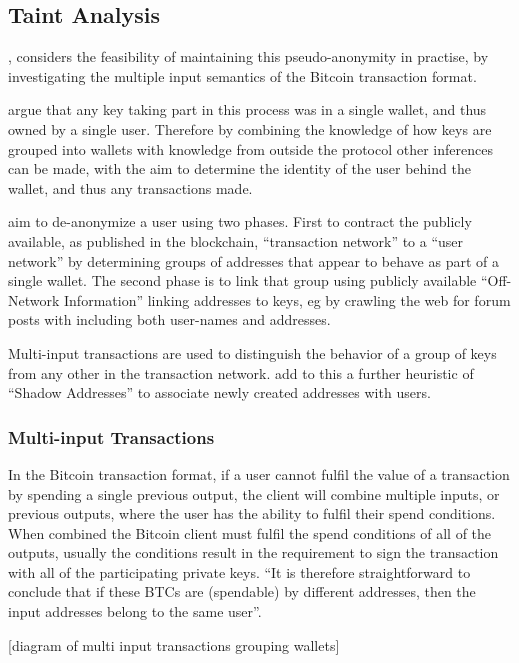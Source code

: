 \subsection{Taint Analysis} \textcite{reid-anon}, considers the feasibility of maintaining this pseudo-anonymity in practise, by investigating the multiple input semantics of the Bitcoin transaction format. 


\textcite{reid-anon} argue that any key taking part in this process was in a single wallet, and thus owned by a single user. Therefore by combining the knowledge of how keys are grouped into wallets with knowledge from outside the protocol other inferences can be made, with the aim to determine the identity of the user behind the wallet, and thus any transactions made.


\textcite{reid-anon} aim to de-anonymize a user using two phases.  First to contract the publicly available, as published in the blockchain, ``transaction network'' to a ``user network'' by determining groups of addresses that appear to behave as part of a single wallet.  The second phase is to  link that group using publicly available ``Off-Network Information'' linking addresses to keys, eg by crawling the web for forum posts with including both user-names and addresses.


Multi-input transactions are used to distinguish the behavior of a group of keys from any other in the transaction network.  \textcite{eval-priv} add to this a further heuristic of ``Shadow Addresses'' to associate newly created addresses with users.

\subsubsection{Multi-input Transactions}
In the Bitcoin transaction format, if a user cannot fulfil the value of a transaction by spending a single previous output, the client will combine multiple inputs, or previous outputs, where the user has the ability to fulfil their spend conditions.  When combined the Bitcoin client must fulfil the spend conditions of all of the outputs, usually the conditions result in the requirement to sign the transaction with all of the participating private keys.  ``It is therefore straightforward to conclude that if these BTCs are (spendable) by different addresses, then the input addresses belong to the same user''\cite{eval-priv}.

[diagram of multi input transactions grouping wallets]


